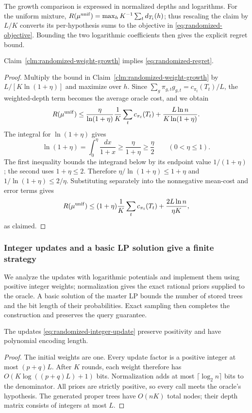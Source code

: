 The growth comparison is expressed in normalized depths and
logarithms. For the uniform mixture,
$R(\mu^{\rm unif})=\max_h K^{-1}\sum_t d_{T_t}(h)$; thus rescaling
the claim by $L/K$ converts its per-hypothesis sums to the objective
in \eqref{eq:randomized-objective}. Bounding the two logarithmic
coefficients then gives the explicit regret bound.
\begin{claim}
\label{clm:randomized-regret-rescaling}
Claim~\ref{clm:randomized-weight-growth} implies \eqref{eq:randomized-regret}.
\end{claim}
\begin{proof}
Multiply the bound in Claim~\ref{clm:randomized-weight-growth} by
$L/[K\ln(1+\eta)]$ and maximize over $h$. Since
$\sum_g\pi_{g,t}g_{g,t}=c_{\pi_t}(T_t)/L$, the weighted-depth
term becomes the average oracle cost, and we obtain
\[
 R(\mu^{\rm unif})\le
 \frac{\eta}{\ln(1+\eta)}\frac1K\sum_tc_{\pi_t}(T_t)
 +\frac{L\ln n}{K\ln(1+\eta)}.
\]
The integral for $\ln(1+\eta)$ gives
\[
 \ln(1+\eta)=\int_0^\eta\frac{dx}{1+x}
       \ge\frac{\eta}{1+\eta}\ge\frac{\eta}{2}
       \qquad(0<\eta\le1).
\]
The first inequality bounds the integrand below by its endpoint
value $1/(1+\eta)$; the second uses $1+\eta\le2$.
Therefore
$\eta/\ln(1+\eta)\le1+\eta$ and
$1/\ln(1+\eta)\le2/\eta$. Substituting separately into the
nonnegative mean-cost and error terms gives
\[
 R(\mu^{\rm unif})\le
 (1+\eta)\frac1K\sum_tc_{\pi_t}(T_t)
                  +\frac{2L\ln n}{\eta K},
\]
as claimed.
\end{proof}

\subsubsection{Integer updates and a basic LP solution give a finite strategy}

We analyze the updates with logarithmic potentials and implement them
using positive integer weights; normalization gives the exact rational
priors supplied to the oracle. A basic solution of the master LP bounds
the number of stored trees and the bit length of their probabilities.
Exact sampling then completes the construction and preserves the query
guarantee.

\begin{claim}
The updates \eqref{eq:randomized-integer-update} preserve positivity
and have polynomial encoding length.
\end{claim}
\begin{proof}
The initial weights are one. Every update factor is a positive
integer at most $(p+q)L$. After $K$ rounds, each weight therefore
has $O(K\log((p+q)L)+1)$ bits. Normalization adds at most
$\lceil\log_2n\rceil$ bits to the denominator. All priors are
strictly positive, so every call meets the oracle's hypothesis.
The generated proper trees have $O(nK)$ total nodes; their depth
matrix consists of integers at most $L$.
\end{proof}

